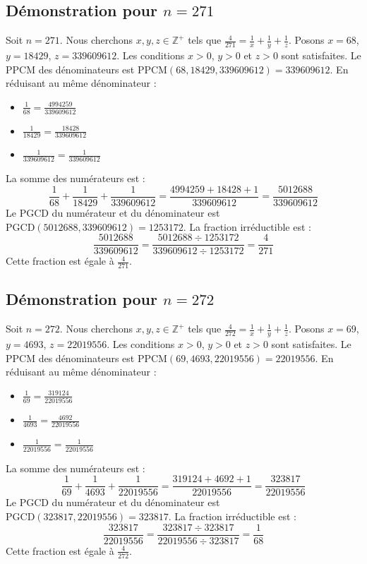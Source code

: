 \documentclass[11pt,a4paper]{article}
\begin{document}
\subsection{Démonstration pour $n = 271$}
Soit $n = 271$. Nous cherchons $x, y, z \in \mathbb{Z}^{+}$ tels que $\frac{4}{271} = \frac{1}{x} + \frac{1}{y} + \frac{1}{z}$.
Posons $x = 68$, $y = 18429$, $z = 339609612$.
Les conditions $x > 0$, $y > 0$ et $z > 0$ sont satisfaites.
Le PPCM des dénominateurs est $\text{PPCM}(68, 18429, 339609612) = 339609612$.
En réduisant au même dénominateur :
\begin{itemize}
    \item $\frac{1}{68} = \frac{4994259}{339609612}$
    \item $\frac{1}{18429} = \frac{18428}{339609612}$
    \item $\frac{1}{339609612} = \frac{1}{339609612}$
\end{itemize}
La somme des numérateurs est :
$$ \frac{1}{68} + \frac{1}{18429} + \frac{1}{339609612} = \frac{4994259 + 18428 + 1}{339609612} = \frac{5012688}{339609612} $$
Le PGCD du numérateur et du dénominateur est $\text{PGCD}(5012688, 339609612) = 1253172$.
La fraction irréductible est :
$$ \frac{5012688}{339609612} = \frac{5012688 \div 1253172}{339609612 \div 1253172} = \frac{4}{271} $$
Cette fraction est égale à $\frac{4}{271}$.

\subsection{Démonstration pour $n = 272$}
Soit $n = 272$. Nous cherchons $x, y, z \in \mathbb{Z}^{+}$ tels que $\frac{4}{272} = \frac{1}{x} + \frac{1}{y} + \frac{1}{z}$.
Posons $x = 69$, $y = 4693$, $z = 22019556$.
Les conditions $x > 0$, $y > 0$ et $z > 0$ sont satisfaites.
Le PPCM des dénominateurs est $\text{PPCM}(69, 4693, 22019556) = 22019556$.
En réduisant au même dénominateur :
\begin{itemize}
    \item $\frac{1}{69} = \frac{319124}{22019556}$
    \item $\frac{1}{4693} = \frac{4692}{22019556}$
    \item $\frac{1}{22019556} = \frac{1}{22019556}$
\end{itemize}
La somme des numérateurs est :
$$ \frac{1}{69} + \frac{1}{4693} + \frac{1}{22019556} = \frac{319124 + 4692 + 1}{22019556} = \frac{323817}{22019556} $$
Le PGCD du numérateur et du dénominateur est $\text{PGCD}(323817, 22019556) = 323817$.
La fraction irréductible est :
$$ \frac{323817}{22019556} = \frac{323817 \div 323817}{22019556 \div 323817} = \frac{1}{68} $$
Cette fraction est égale à $\frac{4}{272}$.
\end{document}
